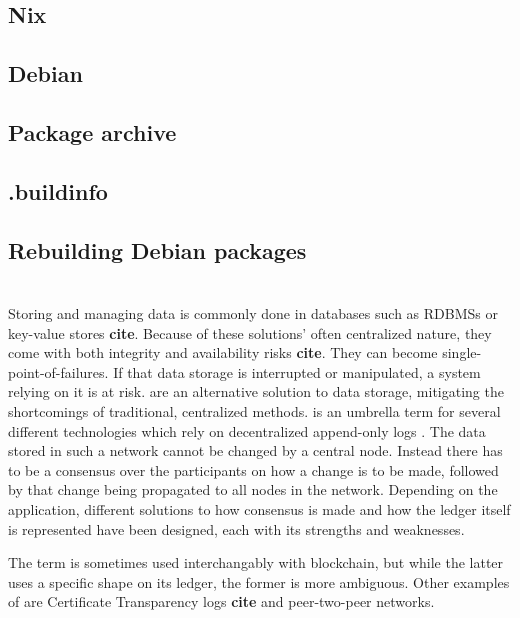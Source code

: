 \documentclass[english, biblatex, digitaloutput]{kththesis}
\begin{document}
\subsection{Nix}

\subsection{Debian}

\subsection{Package archive}

\subsection{.buildinfo}

\subsection{Rebuilding Debian packages}



\section{}

Storing and managing data is commonly done in databases such as \glspl{RDBMS} or key-value stores \textbf{cite}. Because of these solutions' often centralized nature, they come with both integrity and availability risks \textbf{cite}. They can become single-point-of-failures. If that data storage is interrupted or manipulated, a system relying on it is at risk.  are an alternative solution to data storage, mitigating the shortcomings of traditional, centralized methods.  is an umbrella term for several different technologies which rely on decentralized append-only logs \cite{kannengieser_trade-offs_2021} . The data stored in such a network cannot be changed by a central node. Instead there has to be a consensus over the participants on how a change is to be made, followed by that change being propagated to all nodes in the network. Depending on the application, different solutions to how consensus is made and how the ledger itself is represented have been designed, each with its strengths and weaknesses.

The term  is sometimes used interchangably with blockchain, but while the latter uses a specific shape on its ledger, the former is more ambiguous. Other examples of  are Certificate Transparency logs \textbf{cite} and peer-two-peer networks.
\end{document}
